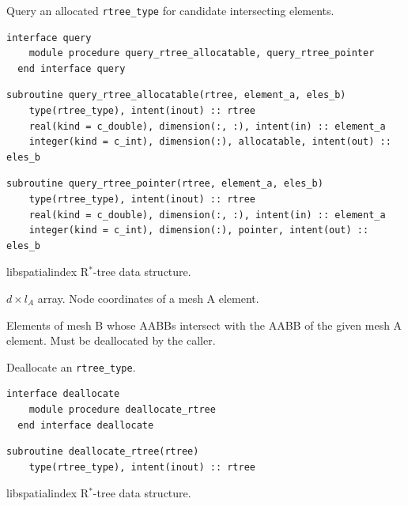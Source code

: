 \documentclass{article}
\begin{document}
\noindent Query an allocated \verb+rtree_type+ for candidate intersecting
elements.
  
\begin{lstlisting}[language=FORTRAN]
  interface query
    module procedure query_rtree_allocatable, query_rtree_pointer
  end interface query
\end{lstlisting}
    
\begin{lstlisting}[language=FORTRAN]    
  subroutine query_rtree_allocatable(rtree, element_a, eles_b)
    type(rtree_type), intent(inout) :: rtree
    real(kind = c_double), dimension(:, :), intent(in) :: element_a
    integer(kind = c_int), dimension(:), allocatable, intent(out) :: eles_b
\end{lstlisting}
  
\begin{lstlisting}[language=FORTRAN]      
  subroutine query_rtree_pointer(rtree, element_a, eles_b)
    type(rtree_type), intent(inout) :: rtree
    real(kind = c_double), dimension(:, :), intent(in) :: element_a
    integer(kind = c_int), dimension(:), pointer, intent(out) :: eles_b
\end{lstlisting}

\begin{description}[font=\ttfamily\bfseries,leftmargin=2.2\parindent,labelindent=1.7\parindent,noitemsep]
  \item[rtree] libspatialindex R${}^*$-tree data structure.
  \item[element\_a] $d \times l_A$ array. Node coordinates of a mesh A element.
  \item[eles\_b] Elements of mesh B whose AABBs intersect with the AABB of the
    given mesh A element. Must be deallocated by the caller.
\end{description}

\noindent Deallocate an \verb+rtree_type+.
  
\begin{lstlisting}[language=FORTRAN]
  interface deallocate
    module procedure deallocate_rtree
  end interface deallocate
\end{lstlisting}
  
\begin{lstlisting}[language=FORTRAN]  
  subroutine deallocate_rtree(rtree)
    type(rtree_type), intent(inout) :: rtree
\end{lstlisting}

\begin{description}[font=\ttfamily\bfseries,leftmargin=2.2\parindent,labelindent=1.7\parindent,noitemsep]
  \item[rtree] libspatialindex R${}^*$-tree data structure.
\end{description}
\end{document}
